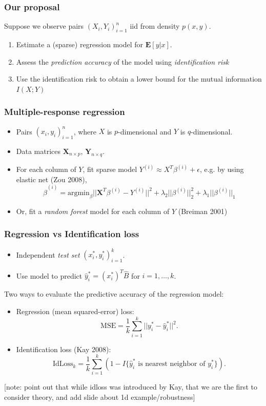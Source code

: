 \documentclass{beamer}
\newcommand{\E}{\textbf{E}}
\newcommand{\bX}{\boldsymbol{X}}
\newcommand{\bY}{\boldsymbol{Y}}
\begin{document}
\begin{frame}
\frametitle{Our proposal}
Suppose we observe pairs $(X_i,Y_i)_{i=1}^n$ iid from density $p(x, y)$.
\begin{enumerate}
\item Estimate a (sparse) regression model for $\E[y|x]$.
\item Assess the \emph{prediction accuracy} of the model using \emph{identification risk}
\item Use the identification risk to obtain a lower bound for the mutual information $I(X; Y)$
\end{enumerate}
\end{frame}

\begin{frame}
\frametitle{Multiple-response regression}
\begin{itemize}
\item Pairs $(x_i,y_i)_{i=1}^n$, where $X$ is $p$-dimensional and $Y$ is $q$-dimensional.
\item Data matrices $\bX_{n \times p}$, $\bY_{n \times q}$.
\item For each column of $Y$, fit sparse model $Y^{(i)} \approx X^T \beta^{(i)}  + \epsilon$, e.g. by using elastic net (Zou 2008), 
\[
\hat{\beta}^{(i)} = \text{argmin}_\beta ||\bX^T \beta^{(i)} - Y^{(i)}||^2 + \lambda_2 ||\beta^{(i)}||_2^2 + \lambda_1 ||\beta^{(i)}||_1
\]
\item Or, fit a \emph{random forest} model for each column of $Y$ (Breiman 2001)
\end{itemize}
\end{frame}


\begin{frame}
\frametitle{Regression vs Identification loss}
\begin{itemize}
\item Independent \emph{test set} $(x_i^*, y_i^*)_{i=1}^k$. 
\item Use model to predict $\hat{y}_i^* = (x_i^*)^T \hat{B}$ for $i = 1,\hdots, k$.
\end{itemize}
Two ways to evaluate the predictive accuracy of the regression model:
\begin{itemize}
\item Regression (mean squared-error) loss:
\[
\text{MSE} = \frac{1}{k} \sum_{i=1}^k ||y_i^* - \hat{y}_i^*||^2.
\]
\item Identification loss (Kay 2008):
\[
\text{IdLoss}_k = \frac{1}{k} \sum_{i=1}^k (1 - I\{\hat{y}_i^* \text{ is nearest neighbor of }y_i^*\}).
\]
\end{itemize}

[note: point out that while idloss was introduced by Kay, that we are the first to consider theory, and add slide about 1d example/robustness]

\end{frame}
\end{document}
